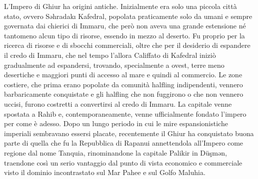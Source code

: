 \documentclass[10pt, a4paper]{report}
\begin{document}
\begin{multicols}{2}
L’Impero di Ghiur ha origini antiche. Inizialmente era solo una piccola città stato, ovvero Səhradakı Kafedral, popolata praticamente solo da umani e sempre governata dai chierici di Immaru, che però non aveva una grande estensione né tantomeno alcun tipo di risorse, essendo in mezzo al deserto. Fu proprio per la ricerca di risorse e di sbocchi commerciali, oltre che per il desiderio di espandere il credo di Immaru, che nel tempo l’allora Califfato di Kafedral iniziò gradualmente ad espandersi, trovando, specialmente a ovest, terre meno desertiche e maggiori punti di accesso al mare e quindi al commercio. Le zone costiere, che prima erano popolate da comunità halfling indipendenti, vennero barbaricamente conquistate e gli halfling che non fuggirono o che non vennero uccisi, furono costretti a convertirsi al credo di Immaru. La capitale venne spostata a Rahib e, contemporaneamente, venne ufficialmente fondato l’impero per come è adesso. Dopo un lungo periodo in cui le mire espansionistiche imperiali sembravano essersi placate, recentemente il Ghiur ha conquistato buona parte di quella che fu la Repubblica di Rapanui annettendola all’Impero come regione dal nome Tanquia, rinominandone la capitale Palikir in Düşmən, traendone così un serio vantaggio dal punto di vista economico e commerciale visto il dominio incontrastato sul Mar Pahee e sul Golfo Maluhia.


\end{multicols}
\end{document}
